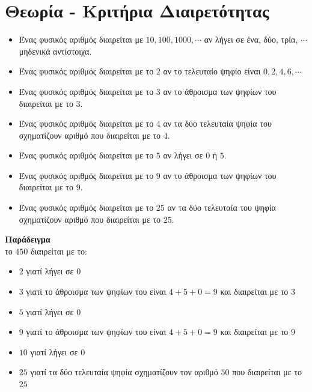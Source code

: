 \documentclass[a4paper,10pt]{report}
\begin{document}
\section*{Θεωρία - Κριτήρια Διαιρετότητας \hfill \small{}}
\begin{itemize}
 \item Ένας φυσικός αριθμός διαιρείται με $10,100,1000,\cdots$ αν λήγει σε ένα, δύο, τρία, $\cdots$ μηδενικά 
       αντίστοιχα.
 \item Ένας φυσικός αριθμός διαιρείται με το $2$ αν το τελευταίο ψηφίο είναι $0,2,4,6,\cdots$
 \item Ένας φυσικός αριθμός διαιρείται με το $3$ αν το άθροισμα των ψηφίων του διαιρείται με το 3.
 \item Ένας φυσικός αριθμός διαιρείται με το $4$ αν τα δύο τελευταία ψηφία του σχηματίζουν αριθμό 
       που διαιρείται με το $4$.
 \item Ένας φυσικός αριθμός διαιρείται με το $5$ αν λήγει σε $0$ ή $5$.
 \item Ένας φυσικός αριθμός διαιρείται με το $9$ αν το άθροισμα των ψηφίων του διαιρείται με το $9$.
 \item Ένας φυσικός αριθμός διαιρείται με το $25$ αν τα δύο τελευταία του ψηφία σχηματίζουν αριθμό που διαιρείται
       με το $25$.
\end{itemize}
\textbf{Παράδειγμα}\\
το $450$ διαιρείται με το:
\begin{itemize}
 \item $2$ γιατί λήγει σε $0$
 \item $3$ γιατί το άθροισμα των ψηφίων του είναι $4+5+0=9$ και διαιρείται με το $3$
 \item $5$ γιατί λήγει σε $0$
 \item $9$ γιατί το άθροισμα των ψηφίων του είναι $4+5+0=9$ και διαιρείται με το $9$
 \item $10$ γιατί λήγει σε $0$
 \item $25$ γιατί τα δύο τελευταία ψηφία σχηματίζουν τον αριθμό $50$ που διαιρείται με το $25$
\end{itemize}
\end{document}
